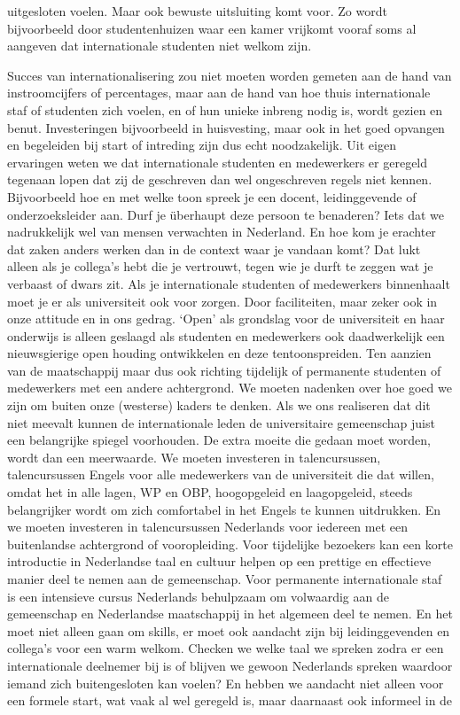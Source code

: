 \documentclass[smallauthor, chapterhaspagenum, nochapterinheader, pagenuminheader,  bigchapnum,medium2, tocpages, garamond, titleinheader]{jote-book}
\begin{document}
uitgesloten voelen. Maar ook bewuste uitsluiting komt voor. Zo wordt bijvoorbeeld door studentenhuizen waar een kamer vrijkomt vooraf soms al aangeven dat internationale studenten niet welkom zijn.



	Succes van internationalisering zou niet moeten worden gemeten aan de hand van instroomcijfers of percentages, maar aan de hand van hoe thuis internationale staf of studenten zich voelen, en of hun unieke inbreng nodig is, wordt gezien en benut. Investeringen bijvoorbeeld in huisvesting, maar ook in het goed opvangen en begeleiden bij start of intreding zijn dus echt noodzakelijk. Uit eigen ervaringen weten we dat internationale studenten en medewerkers er geregeld tegenaan lopen dat zij de geschreven dan wel ongeschreven regels niet kennen. Bijvoorbeeld hoe en met welke toon spreek je een docent, leidinggevende of onderzoeksleider aan. Durf je überhaupt deze persoon te benaderen? Iets dat we nadrukkelijk wel van mensen verwachten in Nederland. En hoe kom je erachter dat zaken anders werken dan in de context waar je vandaan komt? Dat lukt alleen als je collega's hebt die je vertrouwt, tegen wie je durft te zeggen wat je verbaast of dwars zit. Als je internationale studenten of medewerkers binnenhaalt moet je er als universiteit ook voor zorgen. Door faciliteiten, maar zeker ook in onze attitude en in ons gedrag. ‘Open' als grondslag voor de universiteit en haar onderwijs is alleen geslaagd als studenten en medewerkers ook daadwerkelijk een nieuwsgierige open houding ontwikkelen en deze tentoonspreiden. Ten aanzien van de maatschappij maar dus ook richting tijdelijk of permanente studenten of medewerkers met een andere achtergrond. We moeten nadenken over hoe goed we zijn om buiten onze (westerse) kaders te denken. Als we ons realiseren dat dit niet meevalt kunnen de internationale leden de universitaire gemeenschap juist een belangrijke spiegel voorhouden. De extra moeite die gedaan moet worden, wordt dan een meerwaarde. We moeten investeren in talencursussen, talencursussen Engels voor alle medewerkers van de universiteit die dat willen, omdat het in alle lagen, WP en OBP, hoogopgeleid en laagopgeleid, steeds belangrijker wordt om zich comfortabel in het Engels te kunnen uitdrukken. En we moeten investeren in talencursussen Nederlands voor iedereen met een buitenlandse achtergrond of vooropleiding. Voor tijdelijke bezoekers kan een korte introductie in Nederlandse taal en cultuur helpen op een prettige en effectieve manier deel te nemen aan de gemeenschap. Voor permanente internationale staf is een intensieve cursus Nederlands behulpzaam om volwaardig aan de gemeenschap en Nederlandse maatschappij in het algemeen deel te nemen. En het moet niet alleen gaan om skills, er moet ook aandacht zijn bij leidinggevenden en collega's voor een warm welkom. Checken we welke taal we spreken zodra er een internationale deelnemer bij is of blijven we gewoon Nederlands spreken waardoor iemand zich buitengesloten kan voelen? En hebben we aandacht niet alleen voor een formele start, wat vaak al wel geregeld is, maar daarnaast ook informeel in de 
\end{document}
